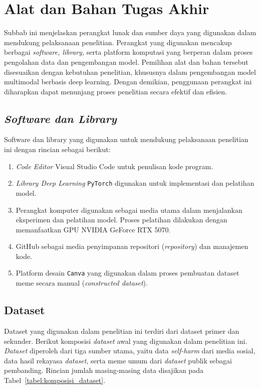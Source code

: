 \section{Alat dan Bahan Tugas Akhir} \label{sec:alat_dan_bahan_tugas_akhir}
Subbab ini menjelaskan perangkat lunak dan sumber daya yang digunakan dalam mendukung pelaksanaan penelitian. Perangkat yang digunakan mencakup berbagai \textit{software, library,} serta platform komputasi yang berperan dalam proses pengolahan data dan pengembangan model. Pemilihan alat dan bahan tersebut disesuaikan dengan kebutuhan penelitian, khususnya dalam pengembangan model multimodal berbasis deep learning. Dengan demikian, penggunaan perangkat ini diharapkan dapat menunjang proses penelitian secara efektif dan efisien.

\subsection{\textit{Software dan Library}} \label{subsec:software_dan_library}
Software dan library yang digunakan untuk mendukung pelaksanaan penelitian ini dengan rincian sebagai berikut:
\begin{enumerate}[noitemsep]
    \item \textit{Code Editor} Visual Studio Code untuk penulisan kode program.
    \item \textit{Library Deep Learning} \texttt{PyTorch} digunakan untuk implementasi dan pelatihan model.
    \item Perangkat komputer digunakan sebagai media utama dalam menjalankan eksperimen dan pelatihan model. Proses pelatihan dilakukan dengan memanfaatkan GPU NVIDIA GeForce RTX 5070.
    \item GitHub sebagai media penyimpanan repositori (\textit{repository}) dan manajemen kode.
    \item Platform desain \texttt{Canva} yang digunakan dalam proses pembuatan dataset meme secara manual (\textit{constructed dataset}).
\end{enumerate}

\subsection{Dataset} \label{subsec:dataset}
Dataset yang digunakan dalam penelitian ini terdiri dari dataset primer dan sekunder. Berikut komposisi \textit{dataset} awal yang digunakan dalam penelitian ini. \textit{Dataset} diperoleh dari tiga sumber utama, yaitu data \textit{self-harm} dari media sosial, data hasil rekayasa \textit{dataset}, serta meme umum dari \textit{dataset} publik sebagai pembanding. Rincian jumlah masing-masing data disajikan pada Tabel~\ref{tabel:komposisi_dataset}.

